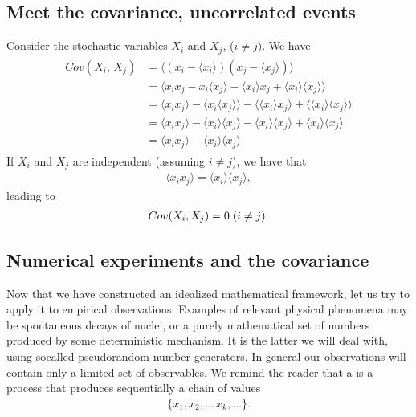\documentclass[letterpaper,10pt,english]{sphinxmanual}
\begin{document}
\subsection{Meet the  covariance, uncorrelated events}
\label{\detokenize{chapter3:meet-the-covariance-uncorrelated-events}}
Consider the stochastic variables \(X_i\) and \(X_j\), (\(i\neq j\)). We have
\begin{equation*}
\begin{split}
\begin{align*}
Cov(X_i,\,X_j) &= \langle (x_i-\langle x_i\rangle)(x_j-\langle x_j\rangle)\rangle\\
&=\langle x_i x_j - x_i\langle x_j\rangle - \langle x_i\rangle x_j + \langle x_i\rangle\langle x_j\rangle\rangle\\
&=\langle x_i x_j\rangle - \langle x_i\langle x_j\rangle\rangle - \langle \langle x_i\rangle x_j \rangle +
\langle \langle x_i\rangle\langle x_j\rangle\rangle \\
&=\langle x_i x_j\rangle - \langle x_i\rangle\langle x_j\rangle - \langle x_i\rangle\langle x_j\rangle +
\langle x_i\rangle\langle x_j\rangle \\
&=\langle x_i x_j\rangle - \langle x_i\rangle\langle x_j\rangle
\end{align*}
\end{split}
\end{equation*}
If \(X_i\) and \(X_j\) are independent (assuming \(i \neq j\)), we have that
\begin{equation*}
\begin{split}
\langle x_i x_j\rangle = \langle x_i\rangle\langle x_j\rangle,
\end{split}
\end{equation*}
leading to
\begin{equation*}
\begin{split}
Cov(X_i, X_j) = 0 \hspace{0.1cm} (i\neq j).
\end{split}
\end{equation*}

\subsection{Numerical experiments and the covariance}
\label{\detokenize{chapter3:numerical-experiments-and-the-covariance}}
Now that we have constructed an idealized mathematical framework, let
us try to apply it to empirical observations. Examples of relevant
physical phenomena may be spontaneous decays of nuclei, or a purely
mathematical set of numbers produced by some deterministic
mechanism. It is the latter we will deal with, using so\sphinxhyphen{}called pseudo\sphinxhyphen{}random
number generators.  In general our observations will contain only a limited set of
observables. We remind the reader that
a  is a process that produces sequentially a
chain of values
\begin{equation*}
\begin{split}
\{x_1, x_2,\dots\,x_k,\dots\}.
\end{split}
\end{equation*}
\end{document}
